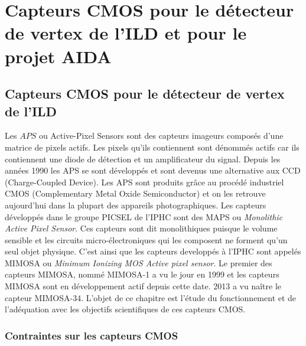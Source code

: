 
\chapter{Capteurs CMOS pour le d\'etecteur de vertex de l'ILD et pour le projet AIDA}


\section{Capteurs CMOS pour le d\'etecteur de vertex de l'ILD}

   Les $APS$ ou Active-Pixel Sensors sont des capteurs imageurs compos\'es d'une matrice de pixels actifs. Les pixels qu'ils contiennent sont d\'enomm\'es actifs car ils contiennent une diode de d\'etection et un amplificateur du signal. Depuis les ann\'ees 1990 les APS se sont d\'evelopp\'es et sont devenus une alternative aux CCD (Charge-Coupled Device). Les APS sont produits gr\^ace au proc\'ed\'e industriel CMOS (Complementary Metal Oxide Semiconductor) et on les retrouve aujourd'hui dans la plupart des appareils photographiques. Les capteurs d\'evelopp\'es dans le groupe PICSEL de l'IPHC sont des MAPS ou \textit{Monolithic Active Pixel Sensor}. Ces capteurs sont dit monolithiques puisque le volume sensible et les circuits micro-\'electroniques qui les composent ne forment qu'un seul objet physique. C'est ainsi que les capteurs developp\'es \`a l'IPHC sont appelés MIMOSA ou \textit{Minimum Ionizing MOS Active pixel sensor}. Le premier des capteurs MIMOSA, nomm\'e MIMOSA-1 a vu le jour en 1999 et les capteurs MIMOSA sont en d\'eveloppement actif depuis cette date. 2013 a vu na\^itre le capteur MIMOSA-34. L'objet de ce chapitre est l'\'etude du fonctionnement et de l'ad\'equation avec les objectifs scientifiques de ces capteurs CMOS.
  
  
  \subsection{Contraintes sur les capteurs CMOS}
  \label{sect:contrainte_physiques}
  
